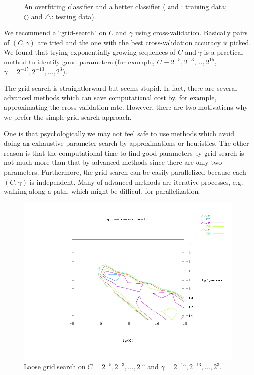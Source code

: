 \documentclass[12pt]{article}
\begin{document}
\begin{figure}[htbp]
\begin{center}
\begin{tabular}{cc}
\label{1c}
\end{tabular}
\end{center}
\caption{An overfitting classifier and a better classifier
( and : training data; $\bigcirc$ and $\bigtriangleup$: 
testing data).}
\label{over}
\end{figure}

We recommend a ``grid-search" on $C$ and
$\gamma$ using cross-validation. Basically pairs of $(C,\gamma)$ are tried 
and the one with the best cross-validation accuracy 
is picked. We found that trying
exponentially growing sequences of $C$ and $\gamma$
is a practical method to identify good parameters
(for example, $C=2^{-5},2^{-3},\ldots,2^{15}$, 
$\gamma=2^{-15},2^{-13},\ldots,2^3$).

The grid-search is straightforward but
seems stupid. In fact, there are several 
advanced methods which can save computational 
cost by, for example, approximating the cross-validation 
rate. However, there are two motivations why we prefer the 
simple grid-search approach.

One is that psychologically we may not feel 
safe to use methods which 
avoid doing an exhaustive parameter search 
by approximations or heuristics.
The other reason is that the computational time to find good 
parameters by grid-search is not much more than that 
by advanced methods since there are only 
two parameters.
Furthermore, the grid-search can be easily parallelized 
because each $(C, \gamma)$ is independent.
Many of advanced methods are iterative processes, e.g.
walking along a path, which might be difficult for parallelization. 

\begin{figure}[htbp]
\begin{center}
\includegraphics[width=0.75\linewidth,viewport=145 55 625 450,clip]{coarser.png}
\end{center}
\caption{Loose grid search on $C=2^{-5},2^{-3},\ldots,2^{15}$ and 
$\gamma=2^{-15},2^{-13},\ldots,2^{3}.$}
\label{coarser}
\end{figure}
\end{document}
